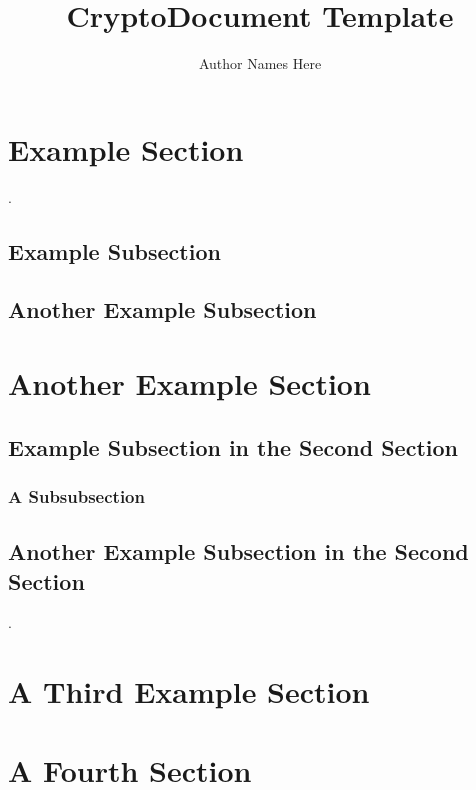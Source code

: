 \documentclass[usenix-proceedings]{cryptodocument}
\title{CryptoDocument Template}
\author{Author Names Here}
\institute{Institute Names Here}
\begin{document}
\maketitle

\begin{abstract}
    \blindtext
\end{abstract}

\tableofcontents

\section{Example Section}
\blindtext \cite{einstein}.

\subsection{Example Subsection}
\blindtext

\subsection{Another Example Subsection}
\blindtext

\section{Another Example Section}

\blindtext

\subsection{Example Subsection in the Second Section}
\blindtext

\subsubsection{A Subsubsection}
\blindtext

\subsection{Another Example Subsection in the Second Section}
\blindtext \cite{dirac}.

\section{A Third Example Section}

\blindtext

\section{A Fourth Section}
\end{document}
